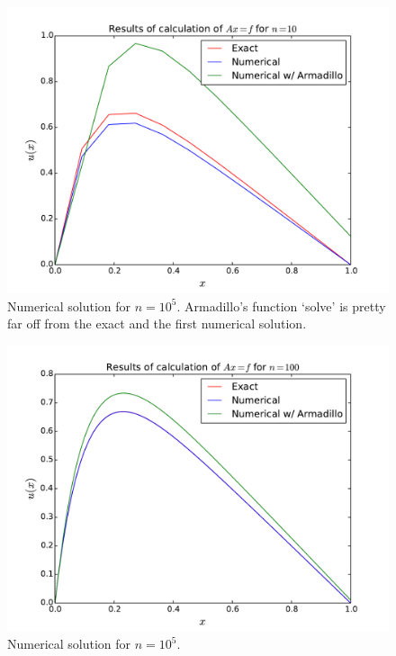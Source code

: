 \documentclass[english, 11pt]{article}
\begin{document}
\begin{figure}[H]
    \centering
    \includegraphics[width = .9\textwidth]{d_n_10.pdf}
    \caption{Numerical solution for $n=10^5$. Armadillo's function `solve' is pretty far off from the exact and the first numerical solution.}
    \label{fig:sol101}
\end{figure}

\begin{figure}[H]
    \centering
    \includegraphics[width = .9\textwidth]{d_n_100.pdf}
    \caption{Numerical solution for $n=10^5$.}
    \label{fig:sol102}
\end{figure}
\end{document}
